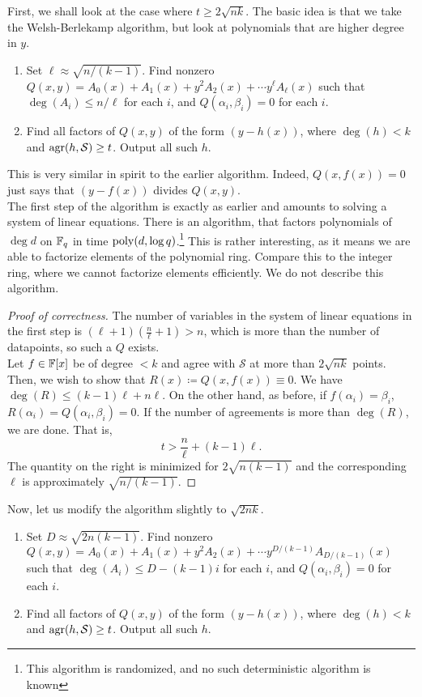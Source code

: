 			First, we shall look at the case where $t \ge 2\sqrt{nk}$. %
			The basic idea is that we take the Welsh-Berlekamp algorithm, but look at polynomials that are higher degree in $y$.

			\begin{enumerate}
				\item Set $\ell \approx \sqrt{n/(k-1)}$. Find nonzero $Q(x,y) = A_0(x) + A_1(x) + y^2 A_2(x) + \cdots y^\ell A_\ell(x)$ such that $\deg(A_i) \le n/\ell$ for each $i$, and $Q(\alpha_i,\beta_i) = 0$ for each $i$.
				\item Find all factors of $Q(x,y)$ of the form $(y - h(x))$, where $\deg(h) < k$ and $\operatorname{agr}(h,\mathcal{S}) \ge t$. Output all such $h$.
			\end{enumerate}
			This is very similar in spirit to the earlier algorithm. Indeed, $Q(x,f(x)) = 0$ just says that $(y-f(x))$ divides $Q(x,y)$. \\
			The first step of the algorithm is exactly as earlier and amounts to solving a system of linear equations. There is an algorithm, that factors polynomials of $\deg d$ on $\mathbb{F}_q$ in time $\operatorname{poly}(d,\log q)$.\footnote{This algorithm is randomized, and no such deterministic algorithm is known} This is rather interesting, as it means we are able to factorize elements of the polynomial ring. Compare this to the integer ring, where we cannot factorize elements efficiently. We do not describe this algorithm.

			\begin{proof}[Proof of correctness]
				The number of variables in the system of linear equations in the first step is $(\ell+1)\left(\frac{n}{\ell}+1\right) > n$, which is more than the number of datapoints, so such a $Q$ exists.\\
				Let $f \in \mathbb{F}[x]$ be of degree $<k$ and agree with $\mathcal{S}$ at more than $2\sqrt{nk}$ points. Then, we wish to show that $R(x) \coloneqq Q(x,f(x)) \equiv 0$. We have $\deg (R)\le (k-1)\ell + n\ell$. On the other hand, as before, if $f(\alpha_i) = \beta_i$, $R(\alpha_i) = Q(\alpha_i,\beta_i) = 0$. If the number of agreements is more than $\deg(R)$, we are done. That is,
				\[ t > \frac{n}{\ell} + (k-1)\ell. \]
				The quantity on the right is minimized for $2\sqrt{n(k-1)}$ and the corresponding $\ell$ is approximately $\sqrt{n/(k-1)}$.
			\end{proof}

			Now, let us modify the algorithm slightly to $\sqrt{2nk}$.
			\begin{enumerate}
				\item Set $D \approx \sqrt{2n(k-1)}$. Find nonzero $Q(x,y) = A_0(x) + A_1(x) + y^2 A_2(x) + \cdots y^{D/(k-1)} A_{D/(k-1)}(x)$ such that $\deg(A_i) \le D - (k-1)i$ for each $i$, and $Q(\alpha_i,\beta_i) = 0$ for each $i$.
				\item Find all factors of $Q(x,y)$ of the form $(y - h(x))$, where $\deg(h) < k$ and $\operatorname{agr}(h,\mathcal{S}) \ge t$. Output all such $h$.
			\end{enumerate}

